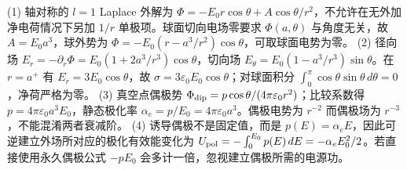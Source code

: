 (1) 轴对称的 \(l=1\) Laplace 外解为 \(\Phi=-E_0r\cos\theta+A\cos\theta/r^2\)，不允许在无外加净电荷情况下另加 \(1/r\) 单极项。球面切向电场零要求 \(\Phi(a,\theta)\) 与角度无关，故 \(A=E_0a^3\)，球外势为 \(\Phi=-E_0(r-a^3/r^2)\cos\theta\)，可取球面电势为零。
(2) 径向场 \(E_r=-\partial_r\Phi=E_0(1+2a^3/r^3)\cos\theta\)，切向场 \(E_\theta=E_0(1-a^3/r^3)\sin\theta\)。在 \(r=a^+\) 有 \(E_r=3E_0\cos\theta\)，故 \(\sigma=3\varepsilon_0E_0\cos\theta\)；对球面积分 \(\int_0^\pi\cos\theta\sin\theta\,d\theta=0\)，净荷严格为零。
(3) 真空点偶极势 \(\Phi_{\rm dip}=p\cos\theta/(4\pi\varepsilon_0r^2)\)；比较系数得 \(p=4\pi\varepsilon_0a^3E_0\)，静态极化率 \(\alpha_e=p/E_0=4\pi\varepsilon_0a^3\)。偶极电势为 \(r^{-2}\) 而偶极场为 \(r^{-3}\)，不能混淆两者衰减阶。
(4) 诱导偶极不是固定值，而是 \(p(E)=\alpha_eE\)，因此可逆建立外场所对应的极化有效能变化为 \(U_{\rm pol}=-\int_0^{E_0}p(E)\,dE=-\alpha_eE_0^2/2\)。若直接使用永久偶极公式 \(-pE_0\) 会多计一倍，忽视建立偶极所需的电源功。
